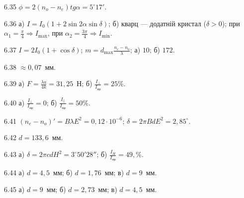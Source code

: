 \begin{Solution}{6.{35}}
        $ \phi = 2(n_o - n_e)tg\alpha = 5^\circ17' $.
    
\end{Solution}
\begin{Solution}{6.{36}}
        а) $ I = I_0(1 + 2\sin2\alpha\sin\delta)$; б) кварц --- додатній кристал ($ \delta > 0 $); при $ \alpha_1 = \frac{\pi}{4} \Rightarrow I_{\max} $, при $ \alpha_2 = \frac{3\pi}{4} \Rightarrow I_{\min}$.
    
\end{Solution}
\begin{Solution}{6.{37}}
        $ I = 2I_0(1 + \cos\delta) $; $ m = d_{\max} \frac{n_e - n_o}{\lambda} $; а) $ 10 $; б) $ 172 $.
    
\end{Solution}
\begin{Solution}{6.{38}}
        $ \approx 0,07  $~мм.
    
\end{Solution}
\begin{Solution}{6.{39}}
        а) $ F = \frac{\lambda a}{4k} = 31,25 $~Н; б) $ \frac{I_\perp}{I_\text{пр}} = 25\% $.
    
\end{Solution}
\begin{Solution}{6.{40}}
         а)  $ \frac{I_\perp}{I_\text{пр}} = 0 $; б) $\frac{I_\parallel}{I_\text{пр}} = 50\% $.
    
\end{Solution}
\begin{Solution}{6.{41}}
        $ (n_e - n_o)' = B\lambda E^2 = 0,12 \cdot 10^{-6} $; $ \delta = 2\pi BdE^2 = 2,85^\circ $.
    
\end{Solution}
\begin{Solution}{6.{42}}
        $ d = 133,6 $~мм.
    
\end{Solution}
\begin{Solution}{6.{43}}
        а) $ \delta = 2\pi cdH^2 = 3^\circ50'28'' $; б) $ \frac{I_H}{I_\text{пр}} = 49,\% $.
    
\end{Solution}
\begin{Solution}{6.{44}}
        а) $ d = 4,5 $~мм; б) $ d = 1,76 $~мм; в) $ d = 9 $~мм.
    
\end{Solution}
\begin{Solution}{6.{45}}
        а) $ d = 9 $~мм; б) $ d = 2,73 $~мм; в) $ d = 4,5 $~мм.
    
\end{Solution}
